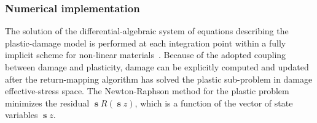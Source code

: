 \subsubsection*{Numerical implementation}

The solution of the differential-algebraic system of equations describing the plastic-damage model is performed at each integration point within a fully implicit scheme for non-linear materials~\cite{Parisio2015,Nagel2016a,Nagel2017,Parisio2018b}. Because of the adopted coupling between damage and plasticity, damage can be explicitly computed and updated after the return-mapping algorithm has solved the plastic sub-problem in damage effective-stress space. The Newton-Raphson method for the plastic problem minimizes the residual $\mbfs{R}\left( \mbfs{z} \right)$, which is a function of the vector of state variables $\mbfs{z}$.

